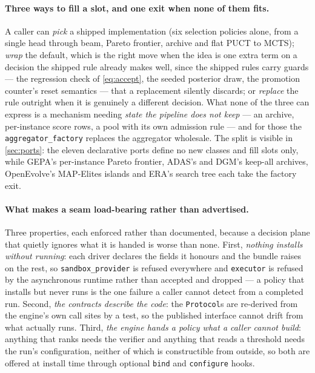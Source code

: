 \documentclass{article}
\newcommand{\code}[1]{\texttt{#1}}
\begin{document}
\paragraph{Three ways to fill a slot, and one exit when none of them fits.} A caller can \emph{pick} a shipped implementation (six selection policies alone, from a single head through beam, Pareto frontier, archive and flat PUCT to MCTS); \emph{wrap} the default, which is the right move when the idea is one extra term on a decision the shipped rule already makes well, since the shipped rules carry guards --- the regression check of \cref{eq:accept}, the seeded posterior draw, the promotion counter's reset semantics --- that a replacement silently discards; or \emph{replace} the rule outright when it is genuinely a different decision. What none of the three can express is a mechanism needing \emph{state the pipeline does not keep} --- an archive, per-instance score rows, a pool with its own admission rule --- and for those the \code{aggregator\_factory} replaces the aggregator wholesale. The split is visible in \cref{sec:ports}: the eleven declarative ports define no new classes and fill slots only, while GEPA's per-instance Pareto frontier, ADAS's and DGM's keep-all archives, OpenEvolve's MAP-Elites islands and ERA's search tree each take the factory exit.

\paragraph{What makes a seam load-bearing rather than advertised.} Three properties, each enforced rather than documented, because a decision plane that quietly ignores what it is handed is worse than none. First, \emph{nothing installs without running}: each driver declares the fields it honours and the bundle raises on the rest, so \code{sandbox\_provider} is refused everywhere and \code{executor} is refused by the asynchronous runtime rather than accepted and dropped --- a policy that installs but never runs is the one failure a caller cannot detect from a completed run. Second, \emph{the contracts describe the code}: the \code{Protocol}s are re-derived from the engine's own call sites by a test, so the published interface cannot drift from what actually runs. Third, \emph{the engine hands a policy what a caller cannot build}: anything that ranks needs the verifier and anything that reads a threshold needs the run's configuration, neither of which is constructible from outside, so both are offered at install time through optional \code{bind} and \code{configure} hooks.
\end{document}
